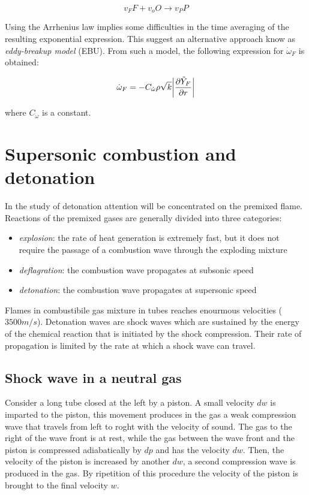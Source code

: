 \documentclass[12pt]{article}
\begin{document}
\begin{equation}
    v_{F}F + v_{o}O \rightarrow v_{P}P
\end{equation}

Using the Arrhenius law implies some difficulties in the time averaging of the resulting exponential expression. This suggest an alternative approach know as \textit{eddy-breakup model} (EBU). From such a model, the following expression for $\dot{\omega}_{F}$ is obtained:

\begin{equation}
    \dot{\omega}_{F} = -C_{\dot{\omega}}\rho \sqrt{k} \bigg| \frac{\partial \Tilde{Y}_{F}}{\partial r}\bigg|
\end{equation}

where $C_{\dot{\omega}}$ is a constant.

\newpage

\section{Supersonic combustion and detonation}

In the study of detonation attention will be concentrated on the premixed flame. Reactions of the premixed gases are generally divided into three categories:

\begin{itemize}
    \item \textit{explosion}: the rate of heat generation is extremely fast, but it does not require the passage of a combustion wave through the exploding mixture
    \item \textit{deflagration}: the combustion wave propagates at subsonic speed
    \item \textit{detonation}: the combustion wave propagates at supersonic speed
\end{itemize}

Flames in combustibile gas mixture in tubes reaches enourmous velocities (~$3500 m/s$). Detonation waves are shock waves which are sustained by the energy of the chemical reaction that is initiated by the shock compression. Their rate of propagation is limited by the rate at which a shock wave can travel.

\subsection{Shock wave in a neutral gas}

Consider a long tube closed at the left by a piston. A small velocity $dw$ is imparted to the piston, this movement produces in the gas a weak compression wave that travels from left to roght with the velocity of sound. The gas to the right of the wave front is at rest, while the gas between the wave front and the piston is compressed adiabatically by $dp$ and has the velocity $dw$. Then, the velocity of the piston is increased by another $dw$, a second compression wave is produced in the gas. By ripetition of this procedure the velocity of the piston is brought to the final velocity $w$.
\end{document}
